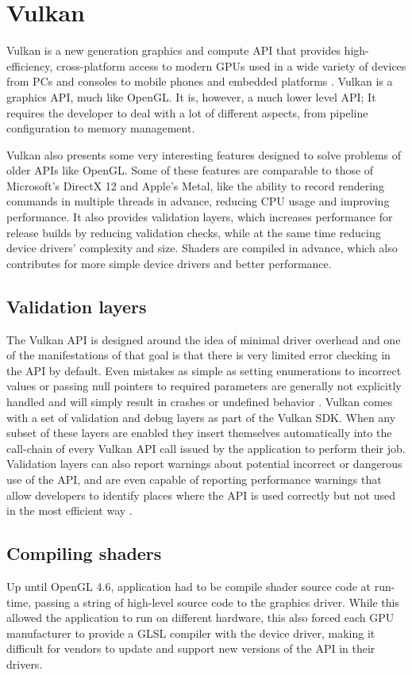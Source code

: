 \section{Vulkan}
Vulkan is a new generation graphics and compute API that provides high-efficiency, cross-platform access to modern GPUs used in a wide variety of devices from PCs and consoles to mobile phones and embedded platforms \cite{vulkan}. Vulkan is a graphics API, much like OpenGL. It is, however, a much lower level API; It requires the developer to deal with a lot of different aspects, from pipeline configuration to memory management.

Vulkan also presents some very interesting features designed to solve problems of older APIs like OpenGL. Some of these features are comparable to those of Microsoft's DirectX 12 and Apple's Metal, like the ability to record rendering commands in multiple threads in advance, reducing CPU usage and improving performance. It also provides validation layers, which increases performance for release builds by reducing validation checks, while at the same time reducing device drivers' complexity and size. Shaders are compiled in advance, which also contributes for more simple device drivers and better performance.

\subsection{Validation layers}
The Vulkan API is designed around the idea of minimal driver overhead and one of the manifestations of that goal is that there is very limited error checking in the API by default. Even mistakes as simple as setting enumerations to incorrect values or passing null pointers to required parameters are generally not explicitly handled and will simply result in crashes or undefined behavior \cite{vulkan_tutorial}. Vulkan comes with a set of validation and debug layers as part of the Vulkan SDK. When any subset of these layers are enabled they insert themselves automatically into the call-chain of every Vulkan API call issued by the application to perform their job. Validation layers can also report warnings about potential incorrect or dangerous use of the API, and are even capable of reporting performance warnings that allow developers to identify places where the API is used correctly but not used in the most efficient way \cite{vulkan_validation_layers}.

\subsection{Compiling shaders}
Up until OpenGL 4.6, application had to be compile shader source code at run-time, passing a string of high-level source code to the graphics driver. While this allowed the application to run on different hardware, this also forced each GPU manufacturer to provide a GLSL compiler with the device driver, making it difficult for vendors to update and support new versions of the API in their drivers.

